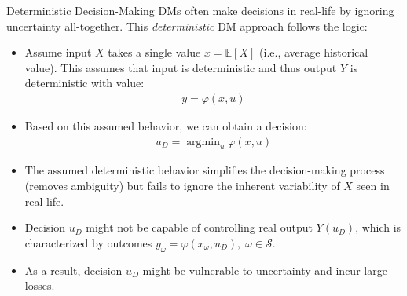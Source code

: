 \documentclass[9pt]{beamer}
\begin{document}
%
\begin{frame}{Deterministic Decision-Making}
DMs often make decisions in real-life by ignoring uncertainty all-together. This {\em deterministic} DM approach follows the logic:
\begin{block}{}
\begin{itemize}
\item Assume input $X$ takes a single value $x={\mathbb{E}}[X]$ (i.e., average historical value). This assumes that input is deterministic and thus output $Y$ is deterministic with value:
\begin{align*}
y=\varphi(x,u)
\end{align*}
\item Based on this assumed behavior, we can obtain a decision: 
\begin{align*}
u_D=\mathop{\textrm{argmin}}_{u}\varphi (x,u)
\end{align*}
\end{itemize}
\end{block}
\begin{itemize}
\item The assumed deterministic behavior simplifies the decision-making process (removes ambiguity) but fails to ignore the inherent variability of $X$ seen in real-life. 

\item Decision $u_D$ might not be capable of controlling real output $Y(u_D)$, which is characterized by outcomes $y_\omega=\varphi(x_\omega,u_D),\; \omega \in \mathcal{S}$. 

\item As a result, decision $u_D$ might be vulnerable to uncertainty and incur large losses. 
\end{itemize}

\end{frame}



% 
\end{document}
